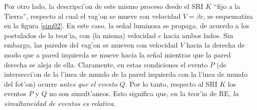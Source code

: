 Por otro lado, la descripci'on de este mismo proceso desde el SRI $K$ ``fijo a la Tierra'', respecto al cual el vag'on se mueve con velocidad $V=\beta c$, se esquematiza en la figura \ref{sim02}. En este caso, la se\~nal luminosa se propaga, de acuerdo a los postulados de la teor'ia, con (la misma) velocidad $c$ hacia ambos lados. Sin embargo, las paredes del vag'on se mueven con velocidad $V$ hacia la derecha de modo que a pared izquierda se mueve hacia la se\~nal mientras que la pared derecha se aleja de ella. Claramente, en estas condiciones el evento $P$ (de intersecci'on de la l'inea de mundo de la pared izquierda con la l'inea de mundo del fot'on) ocurre \textit{antes que el evento} $Q$. Por lo tanto, respecto al SRI $K$ los eventos $P$ y $Q$ no son simult'aneos. Esto significa que, en la teor'ia de RE, \textit{la simultaneidad de eventos es relativa}.

